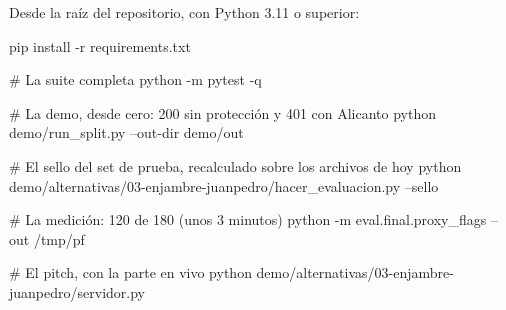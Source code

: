 Desde la raíz del repositorio, con Python 3.11 o superior:

\begin{consola}
pip install -r requirements.txt

# La suite completa
python -m pytest -q

# La demo, desde cero: 200 sin protección y 401 con Alicanto
python demo/run_split.py --out-dir demo/out

# El sello del set de prueba, recalculado sobre los archivos de hoy
python demo/alternativas/03-enjambre-juanpedro/hacer_evaluacion.py --sello

# La medición: 120 de 180 (unos 3 minutos)
python -m eval.final.proxy_flags --out /tmp/pf

# El pitch, con la parte en vivo
python demo/alternativas/03-enjambre-juanpedro/servidor.py
\end{consola}

